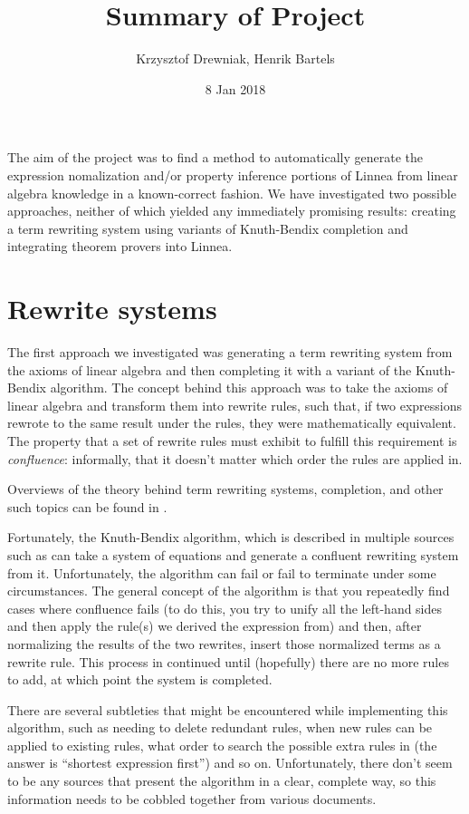 \documentclass[12pt,letterpaper]{article}
\title{Summary of Project}
\author{Krzysztof Drewniak, Henrik Bartels}
\date{8 Jan 2018}
\begin{document}
\maketitle{}

The aim of the project was to find a method to automatically generate the expression nomalization and/or property inference portions of Linnea from linear algebra knowledge in a known-correct fashion.
We have investigated two possible approaches, neither of which yielded any immediately promising results: creating a term rewriting system using variants of Knuth-Bendix completion and integrating theorem provers into Linnea.

\section{Rewrite systems}
The first approach we investigated was generating a term rewriting system from the axioms of linear algebra and then completing it with a variant of the Knuth-Bendix algorithm.
The concept behind this approach was to take the axioms of linear algebra and transform them into rewrite rules, such that, if two expressions rewrote to the same result under the rules, they were mathematically equivalent.
The property that a set of rewrite rules must exhibit to fulfill this requirement is \emph{confluence}: informally, that it doesn't matter which order the rules are applied in.

Overviews of the theory behind term rewriting systems, completion, and other such topics can be found in \cite{Baader1998,Plaisted1998}.

Fortunately, the Knuth-Bendix algorithm, which is described in multiple sources such as \cite{Dick1991} can take a system of equations and generate a confluent rewriting system from it.
Unfortunately, the algorithm can fail or fail to terminate under some circumstances.
The general concept of the algorithm is that you repeatedly find cases where confluence fails (to do this, you try to unify all the left-hand sides and then apply the rule(s) we derived the expression from) and then, after normalizing the results of the two rewrites, insert those normalized terms as a rewrite rule.
This process in continued until (hopefully) there are no more rules to add, at which point the system is completed.

There are several subtleties that might be encountered while implementing this algorithm, such as needing to delete redundant rules, when new rules can be applied to existing rules, what order to search the possible extra rules in (the answer is ``shortest expression first'') and so on.
Unfortunately, there don't seem to be any sources that present the algorithm in a clear, complete way, so this information needs to be cobbled together from various documents.
\end{document}
